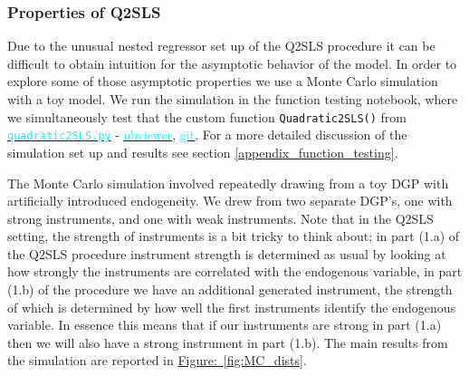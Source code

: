 \documentclass[12pt]{article}
\newcommand{\inlinecode}{\texttt}
\begin{document}
\subsubsection{Properties of Q2SLS} \label{q2sls_properties}
Due to the unusual nested regressor set up of the Q2SLS procedure it can be difficult to obtain intuition for the asymptotic behavior of the model. In order to explore some of those asymptotic properties we use a Monte Carlo simulation with a toy model. We run the simulation in the function testing notebook, where we simultaneously test that the custom function \inlinecode{Quadratic2SLS()} from \href{https://github.com/nadavtadelis/Reproducible_Metrics/blob/master/quadratic2SLS.py}{\textcolor{cyan}{\inlinecode{quadratic2SLS.py}}} - \href{https://nbviewer.jupyter.org/github/nadavtadelis/Reproducible_Metrics/blob/master/function_testing.ipynb}{\textcolor{cyan}{nbviewer}}, \href{https://github.com/nadavtadelis/Reproducible_Metrics/blob/master/function_testing.ipynb}{\textcolor{cyan}{git}}. For a more detailed discussion of the simulation set up and results see section \ref{appendix_function_testing}.

The Monte Carlo simulation involved repeatedly drawing from a toy DGP with artificially introduced endogeneity. We drew from two separate DGP's, one with strong instruments, and one with weak instruments. Note that in the Q2SLS setting, the strength of instruments is a bit tricky to think about; in part (1.a) of the Q2SLS procedure instrument strength is determined as usual by looking at how strongly the instruments are correlated with the endogenous variable, in part (1.b) of the procedure we have an additional generated instrument, the strength of which is determined by how well the first instruments identify the endogenous variable. In essence this means that if our instruments are strong in part (1.a) then we will also have a strong instrument in part (1.b). The main results from the simulation are reported in \hyperref[fig:MC_dists]{Figure:~\ref*{fig:MC_dists}}.
\end{document}
